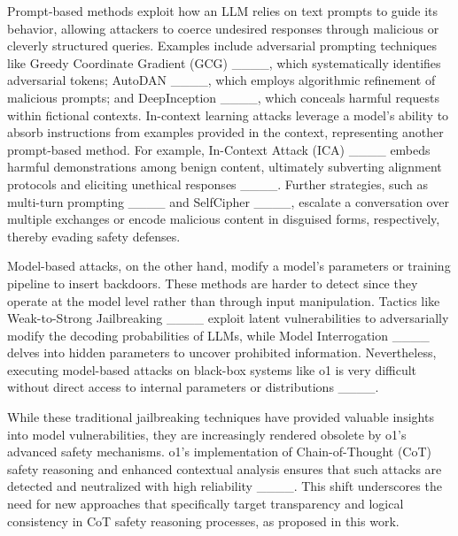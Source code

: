 Prompt-based methods exploit how an LLM relies on text prompts to guide its behavior, allowing attackers to coerce undesired responses through malicious or cleverly structured queries. Examples include adversarial prompting techniques like Greedy Coordinate Gradient (GCG) ____, which systematically identifies adversarial tokens; AutoDAN ____, which employs algorithmic refinement of malicious prompts; and DeepInception ____, which conceals harmful requests within fictional contexts. In-context learning attacks leverage a model’s ability to absorb instructions from examples provided in the context, representing another prompt-based method. For example, In-Context Attack (ICA) ____ embeds harmful demonstrations among benign content, ultimately subverting alignment protocols and eliciting unethical responses ____. Further strategies, such as multi-turn prompting ____ and SelfCipher ____, escalate a conversation over multiple exchanges or encode malicious content in disguised forms, respectively, thereby evading safety defenses.


Model-based attacks, on the other hand, modify a model’s parameters or training pipeline to insert backdoors. These methods are harder to detect since they operate at the model level rather than through input manipulation. Tactics like Weak-to-Strong Jailbreaking ____ exploit latent vulnerabilities to adversarially modify
the decoding probabilities of LLMs, while Model Interrogation ____ delves into hidden parameters to uncover prohibited information. Nevertheless, executing model-based attacks on black-box systems like o1 is very difficult without direct access to internal parameters or distributions ____. 




While these traditional jailbreaking techniques have provided valuable insights into model vulnerabilities, they are increasingly rendered obsolete by o1's advanced safety mechanisms. o1’s implementation of Chain-of-Thought (CoT) safety reasoning and enhanced contextual analysis ensures that such attacks are detected and neutralized with high reliability ____. This shift underscores the need for new approaches that specifically target transparency and logical consistency in CoT safety reasoning processes, as proposed in this work.